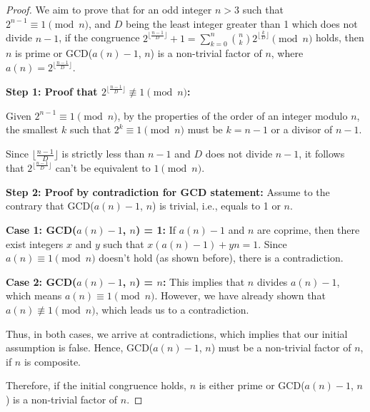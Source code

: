 \begin{proof}
We aim to prove that for an odd integer $n > 3$ such that $2^{n-1} \equiv 1 \pmod{n}$, and $D$ being the least integer greater than 1 which does not divide $n-1$, if the congruence $2^{\lfloor\frac{n-1}{D}\rfloor} + 1 = \sum_{k=0}^{n}\binom{n}{k}2^{\lfloor\frac{k}{D}\rfloor} \pmod{n}$ holds, then $n$ is prime or GCD($a(n) - 1$, $n$) is a non-trivial factor of $n$, where $a(n) = 2^{\lfloor\frac{n-1}{D}\rfloor}$.

\textbf{Step 1: Proof that $2^{\lfloor\frac{n-1}{D}\rfloor} \not\equiv 1 \pmod{n}$:} 

Given $2^{n-1} \equiv 1 \pmod{n}$, by the properties of the order of an integer modulo $n$, the smallest $k$ such that $2^k \equiv 1 \pmod{n}$ must be $k = n-1$ or a divisor of $n-1$.

Since $\lfloor\frac{n-1}{D}\rfloor$ is strictly less than $n-1$ and $D$ does not divide $n-1$, it follows that $2^{\lfloor\frac{n-1}{D}\rfloor}$ can't be equivalent to $1 \pmod{n}$.

\textbf{Step 2: Proof by contradiction for GCD statement:}
Assume to the contrary that GCD($a(n) - 1$, $n$) is trivial, i.e., equals to 1 or $n$. 

\textbf{Case 1: GCD($a(n) - 1$, $n$) = 1:} If $a(n) - 1$ and $n$ are coprime, then there exist integers $x$ and $y$ such that $x(a(n) - 1) + yn = 1$. Since $a(n) \equiv 1 \pmod{n}$ doesn't hold (as shown before), there is a contradiction. 

\textbf{Case 2: GCD($a(n) - 1$, $n$) = $n$:} This implies that $n$ divides $a(n) - 1$, which means $a(n) \equiv 1 \pmod{n}$. However, we have already shown that $a(n) \not\equiv 1 \pmod{n}$, which leads us to a contradiction. 

Thus, in both cases, we arrive at contradictions, which implies that our initial assumption is false. Hence, GCD($a(n) - 1$, $n$) must be a non-trivial factor of $n$, if $n$ is composite.

Therefore, if the initial congruence holds, $n$ is either prime or GCD($a(n) - 1$, $n$) is a non-trivial factor of $n$.
\end{proof}